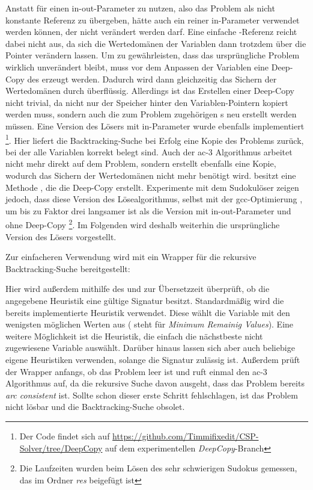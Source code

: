 Anstatt für  einen in-out-Parameter zu nutzen, also das Problem als nicht konstante Referenz zu übergeben, hätte auch ein reiner in-Parameter verwendet
werden können, der nicht verändert werden darf. Eine einfache -Referenz reicht dabei nicht aus, da sich die Wertedomänen der Variablen dann trotzdem über die
Pointer verändern lassen. Um zu gewährleisten, dass das ursprüngliche Problem wirklich unverändert bleibt, muss vor dem Anpassen der Variablen eine Deep-Copy des 
erzeugt werden. Dadurch wird dann gleichzeitig das Sichern der Wertedomänen durch  überflüssig. Allerdings ist das Erstellen einer Deep-Copy nicht
trivial, da nicht nur der Speicher hinter den Variablen-Pointern kopiert werden muss, sondern auch die zum Problem zugehörigen s neu erstellt werden müssen. Eine
Version des Lösers mit in-Parameter wurde ebenfalls implementiert \footnote{Der Code findet sich auf \url{https://github.com/Timmifixedit/CSP-Solver/tree/DeepCopy} auf dem
experimentellen \textit{DeepCopy}-Branch}. Hier liefert die Backtracking-Suche bei Erfolg eine Kopie des Problems zurück, bei der alle Variablen korrekt belegt sind. Auch der
\ac*{ac}-3 Algorithmus arbeitet nicht mehr direkt auf dem Problem, sondern erstellt ebenfalls eine Kopie, wodurch das Sichern der Wertedomänen nicht mehr benötigt wird.
 besitzt eine Methode , die die Deep-Copy erstellt. Experimente mit dem Sudokulöser zeigen jedoch, dass diese Version des Lösealgorithmus, selbst
mit der gcc-Optimierung , um bis zu Faktor drei langsamer ist als die Version mit in-out-Parameter und ohne Deep-Copy \footnote{Die Laufzeiten wurden beim Lösen des
sehr schwierigen Sudokus gemessen, das im Ordner \textit{res} beigefügt ist}. Im Folgenden wird deshalb weiterhin die ursprüngliche Version des Lösers vorgestellt.

Zur einfacheren Verwendung wird mit  ein Wrapper für die rekursive Backtracking-Suche bereitgestellt:

Hier wird außerdem mithilfe des  und  zur Übersetzzeit überprüft, ob die angegebene Heuristik eine gültige Signatur besitzt.
Standardmäßig wird die bereits implementierte Heuristik  verwendet. Diese wählt die Variable mit den wenigsten möglichen Werten aus ( steht
für \textit{Minimum Remainig Values}). Eine weitere Möglichkeit ist die  Heuristik, die einfach die nächstbeste nicht zugewiesene Variable auswählt.
Darüber hinaus lassen sich aber auch beliebige eigene Heuristiken verwenden, solange die Signatur zulässig ist. Außerdem prüft der Wrapper anfangs, ob das Problem leer ist und ruft
einmal den \ac*{ac}-3 Algorithmus auf, da die rekursive Suche davon ausgeht, dass das Problem bereits \textit{arc consistent} ist. Sollte schon dieser erste Schritt fehlschlagen,
ist das Problem nicht lösbar und die Backtracking-Suche obsolet.
